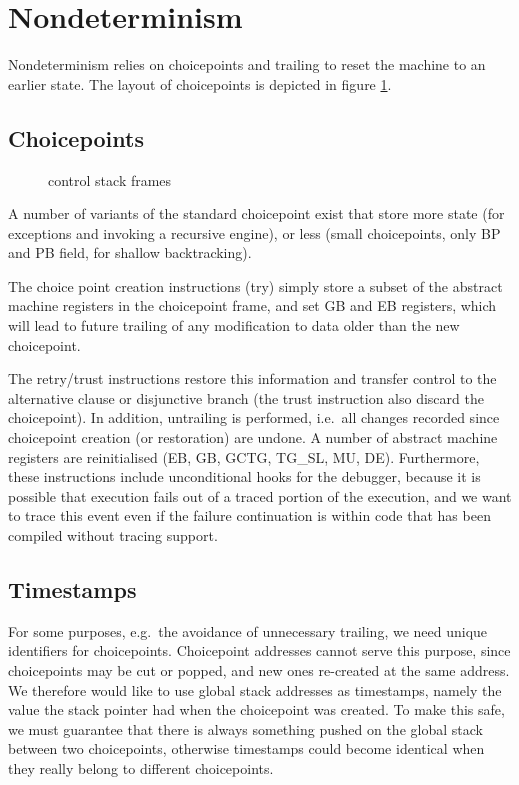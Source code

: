 \section{Nondeterminism}
\label{secnondet}
Nondeterminism  relies on choicepoints  and trailing  to reset the machine
to an earlier state.  The layout of choicepoints is depicted in figure
\ref{figchp}.
\subsection{Choicepoints}
\begin{figure}
\caption{{\eclipse} control stack frames}
\label{figchp}
\end{figure}
A number of variants of the standard choicepoint exist that store more
state (for exceptions  and invoking a recursive engine), or less (small
choicepoints, only BP and PB field, for shallow backtracking).

The choice point creation instructions (try) simply store a subset of the
abstract machine registers in the choicepoint frame, and set GB and EB
registers, which will lead to future trailing of any modification to data
older than the new choicepoint.

The retry/trust instructions restore this information and transfer control
to the alternative clause or disjunctive branch (the trust instruction
also discard the choicepoint). In addition, untrailing is performed, i.e.\
all changes recorded since choicepoint creation (or restoration) are
undone.  A number of abstract machine registers are reinitialised
(EB\index{EB}, GB\index{GB}, GCTG\index{GCTG}, TG_SL\index{TG_SL}, MU, DE). 
Furthermore, these instructions include
unconditional hooks for the debugger, because it is possible that
execution fails out of a traced portion of the execution, and we want
to trace this event even if the failure continuation is within code
that has been compiled without tracing support.


\subsection{Timestamps}
\label{sectimestamps}
For some purposes, e.g.\ the avoidance of unnecessary trailing,
we need unique identifiers for choicepoints. Choicepoint addresses
cannot serve this purpose, since choicepoints may be cut or popped,
and new ones re-created at the same address.
We therefore would like to use global stack addresses as timestamps,
namely the value the stack pointer had when the choicepoint was created.
To make this safe, we must guarantee that there is always something
pushed on the global stack between two choicepoints, otherwise timestamps
could become identical when they really belong to different choicepoints.

